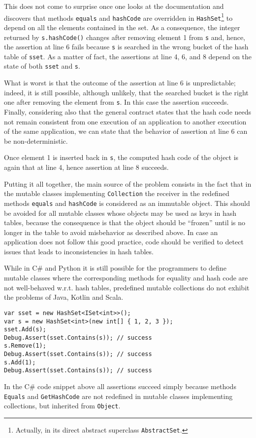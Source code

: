 This does not come to surprise once one looks at the documentation and discovers that methods \lstinline{equals} and \lstinline{hashCode} are overridden in \lstinline{HashSet}\footnote{Actually, in its direct abstract superclass \lstinline{AbstractSet}.} to depend on all the elements contained in the set. As a consequence, the integer returned by  \lstinline{s.hashCode()} changes after removing element 1 from \lstinline{s} and, hence, the assertion at line 6 fails because \lstinline{s} is searched in the wrong bucket of the hash table of \lstinline{sset}.
As a matter of fact, the assertions at line 4, 6, and 8 depend on the state of both \lstinline{sset} and \lstinline{s}.

What is worst is that the outcome of the assertion at line 6 is unpredictable; indeed, it is still possible, although unlikely,
that the searched bucket is the right one after removing the element from \lstinline{s}. In this case the assertion succeeds.
Finally, considering also that the general contract states that the hash code needs not remain consistent
from one execution of an application to another execution of the same application, we can state that 
the behavior of assertion at line 6 can be non-deterministic.

Once element 1 is inserted back in \lstinline{s}, the computed hash code of the object is again that at line 4, hence assertion at line 8 succeeds. 

Putting it all together, the main source of the problem consists in the fact that in the mutable classes implementing \lstinline{Collection} the receiver in the redefined methods \lstinline{equals} and \lstinline{hashCode} is considered as an immutable object. This should be avoided for all mutable classes whose objects may be used as keys in hash tables, because the consequence is that the object should be ``frozen'' until is no longer in the table to avoid misbehavior as described above. In case an application does not follow this good practice, code should be verified to detect
issues that leads to inconsistencies in hash tables. 

While in C\# and Python it is still possible for the programmers to define mutable classes where the corresponding methods for
equality and hash code are not well-behaved w.r.t. hash tables, predefined mutable collections do not exhibit the problems of Java, Kotlin and Scala.
\begin{lstlisting}
var sset = new HashSet<ISet<int>>();
var s = new HashSet<int>(new int[] { 1, 2, 3 });
sset.Add(s);
Debug.Assert(sset.Contains(s)); // success
s.Remove(1);
Debug.Assert(sset.Contains(s)); // success 
s.Add(1);
Debug.Assert(sset.Contains(s)); // success
\end{lstlisting}
In the C\# code snippet above all assertions succeed simply because methods \lstinline{Equals} and \lstinline{GetHashCode} are not redefined
in mutable classes implementing collections, but inherited from \lstinline{Object}.


